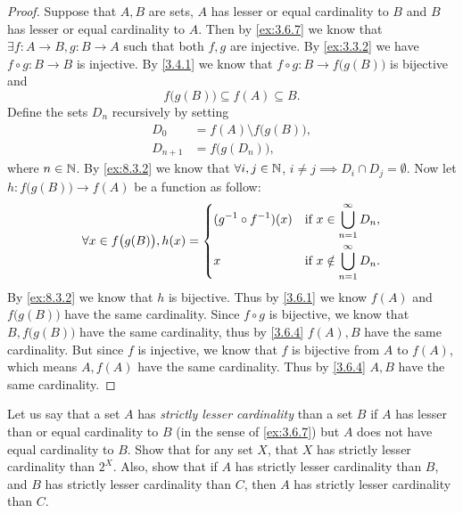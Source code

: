 \begin{proof}
  Suppose that \(A, B\) are sets, \(A\) has lesser or equal cardinality to \(B\) and \(B\) has lesser or equal cardinality to \(A\).
  Then by \cref{ex:3.6.7} we know that \(\exists f : A \to B, g : B \to A\) such that both \(f, g\) are injective.
  By \cref{ex:3.3.2} we have \(f \circ g : B \to B\) is injective.
  By \cref{3.4.1} we know that \(f \circ g : B \to f\big(g(B)\big)\) is bijective and
  \[
    f\big(g(B)\big) \subseteq f(A) \subseteq B.
  \]
  Define the sets \(D_n\) recursively by setting
  \begin{align*}
    D_0       & = f(A) \setminus f\big(g(B)\big), \\
    D_{n + 1} & = f\big(g(D_n)\big),
  \end{align*}
  where \(n \in \mathbb{N}\).
  By \cref{ex:8.3.2} we know that \(\forall i, j \in \mathbb{N}\), \(i \neq j \implies D_i \cap D_j = \emptyset\).
  Now let \(h : f\big(g(B)\big) \to f(A)\) be a function as follow:
  \[
    \forall x \in f\big(g(B)\big), h(x) = \begin{dcases}
      (g^{-1} \circ f^{-1})(x) & \text{if } x \in \bigcup_{n = 1}^\infty D_n,    \\
      x                        & \text{if } x \notin \bigcup_{n = 1}^\infty D_n.
    \end{dcases}
  \]
  By \cref{ex:8.3.2} we know that \(h\) is bijective.
  Thus by \cref{3.6.1} we know \(f(A)\) and \(f\big(g(B)\big)\) have the same cardinality.
  Since \(f \circ g\) is bijective, we know that \(B, f\big(g(B)\big)\) have the same cardinality, thus by \cref{3.6.4} \(f(A), B\) have the same cardinality.
  But since \(f\) is injective, we know that \(f\) is bijective from \(A\) to \(f(A)\), which means \(A, f(A)\) have the same cardinality.
  Thus by \cref{3.6.4} \(A, B\) have the same cardinality.
\end{proof}

\begin{ex}\label{ex:8.3.4}
  Let us say that a set \(A\) has \emph{strictly lesser cardinality} than a set \(B\) if \(A\) has lesser than or equal cardinality to \(B\) (in the sense of \cref{ex:3.6.7}) but \(A\) does not have equal cardinality to \(B\).
  Show that for any set \(X\), that \(X\) has strictly lesser cardinality than \(2^X\).
  Also, show that if \(A\) has strictly lesser cardinality than \(B\), and \(B\) has strictly lesser cardinality than \(C\), then \(A\) has strictly lesser cardinality than \(C\).
\end{ex}

